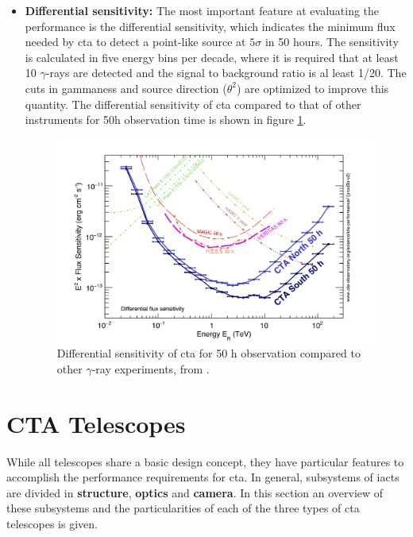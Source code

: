 \documentclass[main.tex]{subfiles}
\begin{document}
\begin{itemize}
\item \textbf{Differential sensitivity:} The most important feature at evaluating the performance is the differential sensitivity, which indicates the minimum flux needed by \gls{cta} to detect a point-like source at $5\sigma$ in 50 hours. The sensitivity is calculated in five energy bins per decade, where it is required that at least 10 $\gamma$-rays are detected and the signal to background ratio is al least 1/20. The cuts in gammaness and source direction ($\theta^2$) are optimized to improve this quantity. The differential sensitivity of \gls{cta} compared to that of other instruments for 50h observation time is shown in figure \ref{fig:ctaperformance}.\\

\begin{figure}
    \centering
    \includegraphics[width=1\textwidth]{Pictures/CTA-Performance-prod3b-v2-Comparison-DifferentialSensitivity-OtherInstruments.pdf}
    \caption{Differential sensitivity of \gls{cta} for 50 h observation compared to other $\gamma$-ray experiments, from \cite{CTAPerformance}.}
    \label{fig:ctaperformance}
\end{figure}
  
\end{itemize}

\section{CTA Telescopes} \label{sec:ctatelescopes}

While all telescopes share a basic design concept, they have particular features to accomplish the performance requirements for \gls{cta}. In general, subsystems of \glspl{iact} are divided in \textbf{structure}, \textbf{optics} and \textbf{camera}. 
In this section an overview of these subsystems and the particularities of each of the three types of \gls{cta} telescopes is given. 
\end{document}
